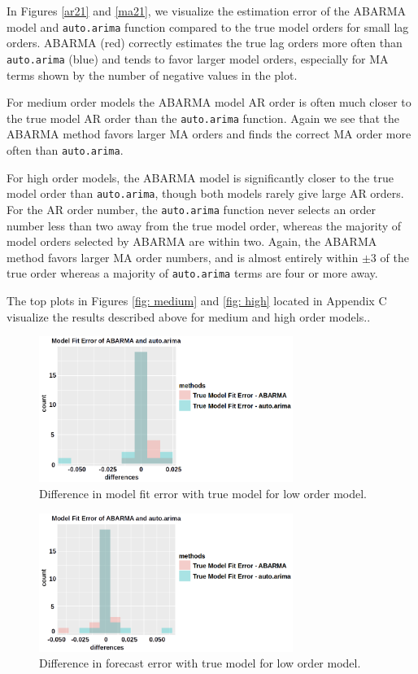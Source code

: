 In Figures \ref{ar21} and \ref{ma21}, we visualize the estimation error of the ABARMA model and {\tt auto.arima} function compared to the true model orders for small lag orders.  ABARMA (red) correctly estimates the true lag orders more often than {\tt auto.arima} (blue) and tends to favor larger model orders, especially for MA terms shown by the number of negative values in the plot.  

For medium order models the ABARMA model AR order is often much closer to the true model AR order than the {\tt auto.arima} function.  Again we see that the ABARMA method favors larger MA orders and finds the correct MA order more often than {\tt auto.arima}.

For high order models, the ABARMA model is significantly closer to the true model order than {\tt auto.arima}, though both models rarely give large AR orders.  For the AR order number, the {\tt auto.arima} function never selects an order number less than two away from the true model order, whereas the majority of model orders selected by ABARMA are within two.  Again, the ABARMA method favors larger MA order numbers, and is almost entirely within $\pm 3$ of the true order whereas a majority of {\tt auto.arima} terms are four or more away.

The top plots in Figures \ref{fig: medium} and \ref{fig: high} located in Appendix C visualize the results described above for medium and high order models..

\begin{figure}
    \centering
    \includegraphics[width=3.25in]{mfrmse21_new.png}
    \caption{Difference in model fit error with true model for low order model.}
    \label{mfrmse21}
\end{figure}

\begin{figure}
    \centering
    \includegraphics[width=3.25in]{fermse21_new.png}
    \caption{Difference in forecast error with true model for low order model.}
    \label{fermse21}
\end{figure}


